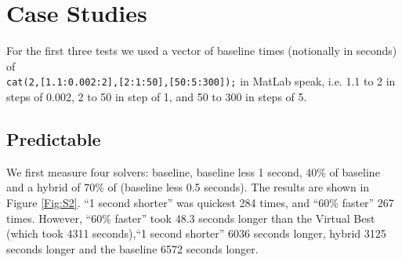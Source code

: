 \documentclass{easychair}
\begin{document}
\section{Case Studies}
For the first three tests we used a vector of baseline times (notionally in seconds) of \\\verb+cat(2,[1.1:0.002:2],[2:1:50],[50:5:300]);+ in MatLab speak, i.e. 1.1 to 2 in steps of 0.002, 2 to 50 in step of 1, and 50 to 300 in steps of 5. 
\subsection{Predictable}\label{sec:Pr}
We first measure four solvers: baseline, baseline less 1 second, 40\% of baseline and a hybrid of 70\% of (baseline less 0.5 seconds). The results are shown in Figure \ref{Fig:S2}. ``1 second shorter'' was quickest 284 times, and ``60\% faster'' 267 times. However, ``60\% faster'' took 48.3 seconds longer than the Virtual Best (which took 4311 seconds),``1 second shorter'' 6036 seconds longer, hybrid  3125 seconds longer and the baseline 6572 seconds longer.
\end{document}
